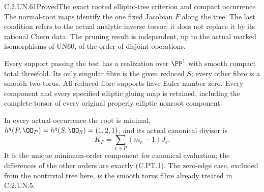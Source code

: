 \begin{statement}{C.2.UN.61}{Proved}{The exact rooted elliptic-tree criterion and compact occurrence}
The normal-root maps identify the one fixed Jacobian $F$ along
the tree. The last condition refers to the actual analytic
inverse torsor; it does not replace it by its rational Chern
data. The pruning result is independent, up to the actual
marked isomorphisms of UN60, of the order of disjoint operations.

Every support passing the test has a realization over $\PP^1$
with smooth compact total threefold. Its only singular fibre
is the given reduced $S$; every other fibre is a smooth
two-torus. All reduced fibre supports have Euler number zero.
Every component and every specified elliptic gluing map is
retained, including the complete torsor of every original
properly elliptic nonroot component.

In every actual occurrence the root is minimal,
$h^q(P,\OO_P)=h^q(S,\OO_S)=(1,2,1)$, and its actual canonical
divisor is
\[
                 K_P=\sum_{e\ni P}(m_e-1)J_e.
                 \tag{C.PT.2}
\]
It is the unique minimum-order component for canonical evaluation;
the differences of the other orders are exactly (C.PT.1).
The zero-edge case, excluded from the nontrivial tree here,
is the smooth torus fibre already treated in C.2.UN.5.
\end{statement}

